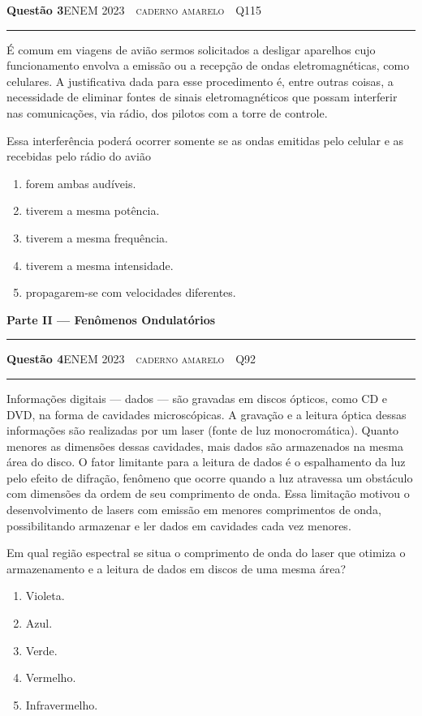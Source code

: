 \documentclass[11pt,a4paper]{article}
\newcommand{\fonte}[1]{{\small\scshape\color{grafite}#1}}
\newcommand{\enem}[3]{\fonte{ENEM #1 \,\textperiodcentered\, #2 \,\textperiodcentered\, Q#3}}
\newenvironment{questao}[2]{%
  \needspace{6\baselineskip}
  \par\addvspace{1.6em}
  {\large\bfseries\color{vinho}Quest\~ao #1}\hfill #2\\[-0.55em]
  {\color{black!25}\rule{\linewidth}{0.4pt}}
  \par\nobreak\smallskip
}{\par\addvspace{0.4em}}
\newcommand{\parte}[1]{%
  \needspace{7\baselineskip}
  \vspace{1.8em}
  {\Large\bfseries #1}\\[-0.55em]
  {\color{black!30}\rule{\linewidth}{0.5pt}}
  \par\nobreak\smallskip
}
\begin{document}
\begin{questao}{3}{\enem{2023}{caderno amarelo}{115}}
\'E comum em viagens de avi\~ao sermos solicitados a desligar aparelhos cujo
funcionamento envolva a emiss\~ao ou a recep\c{c}\~ao de ondas
eletromagn\'eticas, como celulares. A justificativa dada para esse
procedimento \'e, entre outras coisas, a necessidade de eliminar fontes de
sinais eletromagn\'eticos que possam interferir nas comunica\c{c}\~oes, via
r\'adio, dos pilotos com a torre de controle.

Essa interfer\^encia poder\'a ocorrer somente se as ondas emitidas pelo
celular e as recebidas pelo r\'adio do avi\~ao
\begin{enumerate}
  \item forem ambas aud\'iveis.
  \item tiverem a mesma pot\^encia.
  \item tiverem a mesma frequ\^encia.
  \item tiverem a mesma intensidade.
  \item propagarem-se com velocidades diferentes.
\end{enumerate}
\end{questao}

\parte{Parte II --- Fen\^omenos Ondulat\'orios}

\begin{questao}{4}{\enem{2023}{caderno amarelo}{92}}
Informa\c{c}\~oes digitais --- dados --- s\~ao gravadas em discos \'opticos,
como CD e DVD, na forma de cavidades microsc\'opicas. A grava\c{c}\~ao e a
leitura \'optica dessas informa\c{c}\~oes s\~ao realizadas por um laser (fonte
de luz monocrom\'atica). Quanto menores as dimens\~oes dessas cavidades,
mais dados s\~ao armazenados na mesma \'area do disco. O fator limitante para
a leitura de dados \'e o espalhamento da luz pelo efeito de difra\c{c}\~ao,
fen\^omeno que ocorre quando a luz atravessa um obst\'aculo com dimens\~oes
da ordem de seu comprimento de onda. Essa limita\c{c}\~ao motivou o
desenvolvimento de lasers com emiss\~ao em menores comprimentos de onda,
possibilitando armazenar e ler dados em cavidades cada vez menores.

Em qual regi\~ao espectral se situa o comprimento de onda do laser que
otimiza o armazenamento e a leitura de dados em discos de uma mesma \'area?
\begin{enumerate}
  \item Violeta.
  \item Azul.
  \item Verde.
  \item Vermelho.
  \item Infravermelho.
\end{enumerate}
\end{questao}
\end{document}
